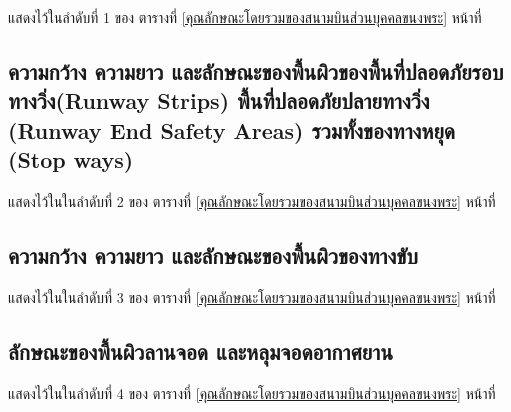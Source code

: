 แสดงไว้ในลำดับที่ 1 ของ ตารางที่ \ref{คุณลักษณะโดยรวมของสนามบินส่วนบุคคลขนงพระ} หน้าที่ \pageref{คุณลักษณะโดยรวมของสนามบินส่วนบุคคลขนงพระ}

\subsection{ความกว้าง ความยาว และลักษณะของพื้นผิวของพื้นที่ปลอดภัยรอบทางวิ่ง(Runway Strips) พื้นที่ปลอดภัยปลายทางวิ่ง (Runway End Safety Areas) รวมทั้งของทางหยุด (Stop ways)}

แสดงไว้ในในลำดับที่ 2 ของ ตารางที่ \ref{คุณลักษณะโดยรวมของสนามบินส่วนบุคคลขนงพระ} หน้าที่ \pageref{คุณลักษณะโดยรวมของสนามบินส่วนบุคคลขนงพระ}

\subsection{ความกว้าง ความยาว และลักษณะของพื้นผิวของทางขับ}

แสดงไว้ในในลำดับที่ 3 ของ ตารางที่ \ref{คุณลักษณะโดยรวมของสนามบินส่วนบุคคลขนงพระ} หน้าที่ \pageref{คุณลักษณะโดยรวมของสนามบินส่วนบุคคลขนงพระ}

\subsection{ลักษณะของพื้นผิวลานจอด และหลุมจอดอากาศยาน}

แสดงไว้ในในลำดับที่ 4 ของ ตารางที่ \ref{คุณลักษณะโดยรวมของสนามบินส่วนบุคคลขนงพระ} หน้าที่ \pageref{คุณลักษณะโดยรวมของสนามบินส่วนบุคคลขนงพระ}

